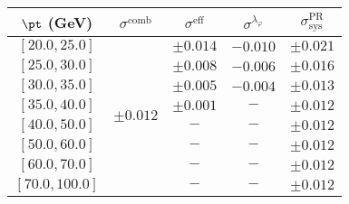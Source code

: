 \begin{tabular}{c||c|c|c||c}
$\pt$ (GeV) & $\sigma^{\text{comb}}$ & $\sigma^{\text{eff}}$ & $\sigma^{\lambda_\varphi}$ & $\sigma_{\text{sys}}^{\text{PR}}$  \\
\hline
$[20.0, 25.0]$ & \multirow{8}{*}{$\pm0.012$} & $\pm0.014$ & $-0.010$ & $\pm0.021$\\
$[25.0, 30.0]$ &  & $\pm0.008$ & $-0.006$ & $\pm0.016$\\
$[30.0, 35.0]$ &  & $\pm0.005$ & $-0.004$ & $\pm0.013$\\
$[35.0, 40.0]$ &  & $\pm0.001$ & $-$ & $\pm0.012$\\
$[40.0, 50.0]$ &  & $-$ & $-$ & $\pm0.012$\\
$[50.0, 60.0]$ &  & $-$ & $-$ & $\pm0.012$\\
$[60.0, 70.0]$ &  & $-$ & $-$ & $\pm0.012$\\
$[70.0, 100.0]$ &  & $-$ & $-$ & $\pm0.012$\\
\end{tabular}

